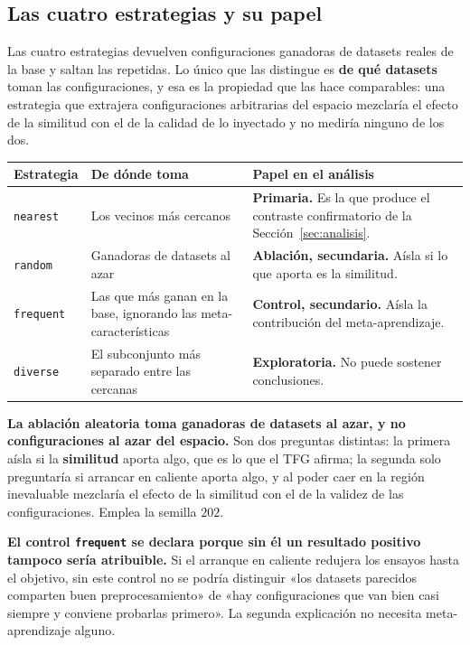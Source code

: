 \documentclass[11pt,letterpaper]{article}
\begin{document}
\subsection{Las cuatro estrategias y su papel}
\label{sec:estrategias}

Las cuatro estrategias devuelven configuraciones ganadoras de datasets reales de
la base y saltan las repetidas. Lo único que las distingue es \textbf{de qué
datasets} toman las configuraciones, y esa es la propiedad que las hace
comparables: una estrategia que extrajera configuraciones arbitrarias del espacio
mezclaría el efecto de la similitud con el de la calidad de lo inyectado y no
mediría ninguno de los dos.

\begin{center}
\begin{tabularx}{\textwidth}{L{2.2cm} L{4.6cm} Y}
\toprule
{} \textbf{Estrategia} & \textbf{De dónde toma} & \textbf{Papel en el análisis} \\
\midrule
\texttt{nearest} & Los vecinos más cercanos &
\textbf{Primaria.} Es la que produce el contraste confirmatorio de la
Sección~\ref{sec:analisis}. \\
\midrule
\texttt{random} & Ganadoras de datasets al azar &
\textbf{Ablación, secundaria.} Aísla si lo que aporta es la similitud. \\
\midrule
\texttt{frequent} & Las que más ganan en la base, ignorando las
meta-características &
\textbf{Control, secundario.} Aísla la contribución del meta-aprendizaje. \\
\midrule
\texttt{diverse} & El subconjunto más separado entre las cercanas &
\textbf{Exploratoria.} No puede sostener conclusiones. \\
\bottomrule
\end{tabularx}
\end{center}

\textbf{La ablación aleatoria toma ganadoras de datasets al azar, y no
configuraciones al azar del espacio.} Son dos preguntas distintas: la primera
aísla si la \textbf{similitud} aporta algo, que es lo que el TFG afirma; la
segunda solo preguntaría si arrancar en caliente aporta algo, y al poder caer en
la región inevaluable mezclaría el efecto de la similitud con el de la validez de
las configuraciones. Emplea la semilla $202$.

\textbf{El control \texttt{frequent} se declara porque sin él un resultado
positivo tampoco sería atribuible.} Si el arranque en caliente redujera los
ensayos hasta el objetivo, sin este control no se podría distinguir «los datasets
parecidos comparten buen preprocesamiento» de «hay configuraciones que van bien
casi siempre y conviene probarlas primero». La segunda explicación no necesita
meta-aprendizaje alguno.
\end{document}

